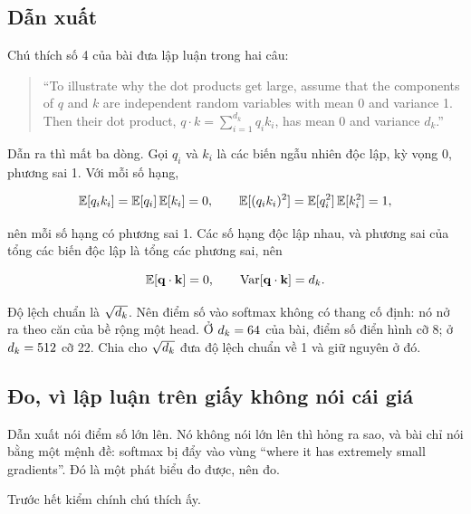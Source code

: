 \subsection*{Dẫn xuất}

%
Chú thích số 4 của bài đưa lập luận trong hai câu:

\begin{quote}
\enquote{To illustrate why the dot products get large, assume that the
components of \(q\) and \(k\) are independent random variables with mean 0 and
variance 1. Then their dot product, \(q \cdot k = \sum_{i=1}^{d_k} q_i k_i\),
has mean 0 and variance \(d_k\).}
\end{quote}

Dẫn ra thì mất ba dòng. Gọi \(q_i\) và \(k_i\) là các biến ngẫu nhiên độc lập,
kỳ vọng 0, phương sai 1. Với mỗi số hạng,

\begin{equation}
  \mathbb{E}[q_i k_i] = \mathbb{E}[q_i]\,\mathbb{E}[k_i] = 0,
  \qquad
  \mathbb{E}[(q_i k_i)^2] = \mathbb{E}[q_i^2]\,\mathbb{E}[k_i^2] = 1,
  \label{eq:ch07-so-hang}
\end{equation}

nên mỗi số hạng có phương sai 1. Các số hạng độc lập nhau, và phương sai của
tổng các biến độc lập là tổng các phương sai, nên

\begin{equation}
  \mathbb{E}[\mathbf{q} \cdot \mathbf{k}] = 0,
  \qquad
  \operatorname{Var}[\mathbf{q} \cdot \mathbf{k}] = d_{k} .
  \label{eq:ch07-phuong-sai}
\end{equation}

Độ lệch chuẩn là \(\sqrt{d_{k}}\). Nên điểm số vào softmax không có thang cố
định: nó nở ra theo căn của bề rộng một head. Ở \(d_{k} = 64\) của bài, điểm số điển
hình cỡ 8; ở \(d_{k} = 512\) cỡ 22. Chia cho \(\sqrt{d_{k}}\) đưa độ lệch chuẩn về
1 và giữ nguyên ở đó.

\subsection*{Đo, vì lập luận trên giấy không nói cái giá}

%
Dẫn xuất nói điểm số lớn lên. Nó không nói lớn lên thì hỏng ra sao, và bài chỉ
nói bằng một mệnh đề: softmax bị đẩy vào vùng \enquote{where it has extremely
small gradients}. Đó là một phát biểu đo được, nên đo.

Trước hết kiểm chính chú thích ấy.

